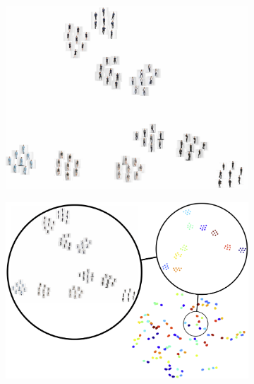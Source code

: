 		\begin{figure}[htp]
			\centering
			\begin{subfigure}{0.49\linewidth}
			\includegraphics[trim={0cm 0cm 0cm 0cm},clip, width=1.0\linewidth]{fig/factor/tsne_img}
			\end{subfigure}
			\begin{subfigure}{0.49\linewidth}
			\includegraphics[trim={0cm 0cm 0cm 0cm},clip, width=1.0\linewidth]{fig/factor/tsne_bubble}
			\end{subfigure}

\end{figure}

